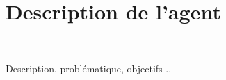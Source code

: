 \chapter*{Description de l'agent}
\thispagestyle{plain}
~\\[1cm]
{ \large

Description, problématique, objectifs ..

}
